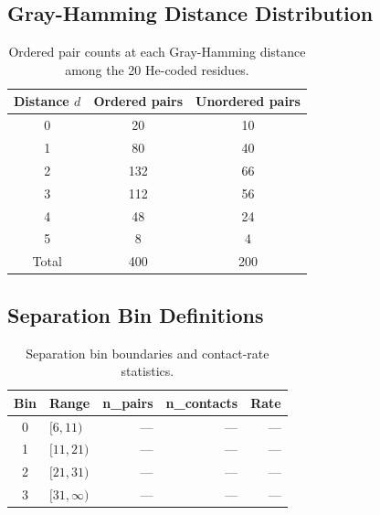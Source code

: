 \subsection{Gray-Hamming Distance Distribution}
\begin{table}[ht]
	\centering
	\caption{Ordered pair counts at each Gray-Hamming distance among the 20 He-coded residues.}
	\label{tab:gray-dist}
	\begin{tabular}{ccc}
		\toprule
		Distance $d$ & Ordered pairs & Unordered pairs \\
		\midrule
		0            & 20            & 10              \\
		1            & 80            & 40              \\
		2            & 132           & 66              \\
		3            & 112           & 56              \\
		4            & 48            & 24              \\
		5            & 8             & 4               \\
		\midrule
		Total        & 400           & 200             \\
		\bottomrule
	\end{tabular}
\end{table}

\subsection{Separation Bin Definitions}
\begin{table}[ht]
	\centering
	\caption{Separation bin boundaries and contact-rate statistics.}
	\label{tab:sep-bins}
	\begin{tabular}{clrrr}
		\toprule
		Bin & Range          & n\_pairs & n\_contacts & Rate \\
		\midrule
		0   & $[6, 11)$      & ---      & ---         & ---  \\
		1   & $[11, 21)$     & ---      & ---         & ---  \\
		2   & $[21, 31)$     & ---      & ---         & ---  \\
		3   & $[31, \infty)$ & ---      & ---         & ---  \\
		\bottomrule
	\end{tabular}
\end{table}

